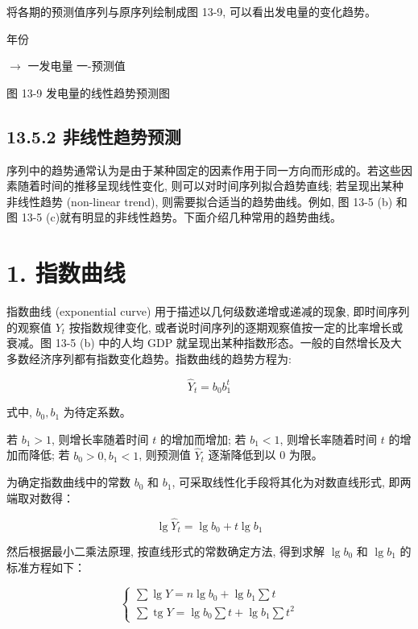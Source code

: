 \documentclass[10pt]{article}
\begin{document}
\begin{CJK*}{UTF8}{bsmi}
将各期的预测值序列与原序列绘制成图 13-9, 可以看出发电量的变化趋势。

\begin{center}
\end{center}

\begin{center}
\end{center}

年份

$\rightarrow$ 一发电量 一-预测值

图 13-9 发电量的线性趋势预测图

\subsection*{13.5.2 非线性趋势预测}
序列中的趋势通常认为是由于某种固定的因素作用于同一方向而形成的。若这些因素随着时间的推移呈现线性变化, 则可以对时间序列拟合趋势直线; 若呈现出某种非线性趋势 (non-linear trend), 则需要拟合适当的趋势曲线。例如, 图 13-5 (b) 和图 13-5 (c)就有明显的非线性趋势。下面介绍几种常用的趋势曲线。

\section*{1. 指数曲线}
指数曲线 (exponential curve) 用于描述以几何级数递增或递减的现象, 即时间序列的观察值 $Y_{t}$ 按指数规律变化, 或者说时间序列的逐期观察值按一定的比率增长或衰减。图 13-5 (b) 中的人均 GDP 就呈现出某种指数形态。一般的自然增长及大多数经济序列都有指数变化趋势。指数曲线的趋势方程为:


\begin{equation*}
\hat{Y}_{t}=b_{0} b_{1}^{t} \tag{13.22}
\end{equation*}


式中, $b_{0}, b_{1}$ 为待定系数。

若 $b_{1}>1$, 则增长率随着时间 $t$ 的增加而增加; 若 $b_{1}<1$, 则增长率随着时间 $t$ 的增加而降低; 若 $b_{0}>0, b_{1}<1$, 则预测值 $\hat{Y}_{t}$ 逐渐降低到以 0 为限。

为确定指数曲线中的常数 $b_{0}$ 和 $b_{1}$, 可采取线性化手段将其化为对数直线形式, 即两端取对数得：


\begin{equation*}
\lg \hat{Y}_{t}=\lg b_{0}+t \lg b_{1} \tag{13.23}
\end{equation*}


然后根据最小二乘法原理, 按直线形式的常数确定方法, 得到求解 $\lg b_{0}$ 和 $\lg b_{1}$ 的标准方程如下：

\[
\left\{\begin{array}{l}
\sum \lg Y=n \lg b_{0}+\lg b_{1} \sum t  \tag{13.24}\\
\sum \operatorname{tg} Y=\lg b_{0} \sum t+\lg b_{1} \sum t^{2}
\end{array}\right.
\]


\end{CJK*}
\end{document}
